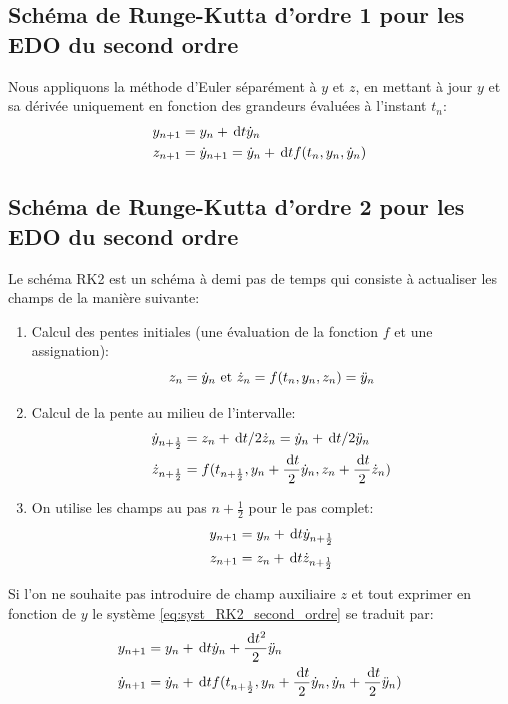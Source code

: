 \documentclass[10pt]{book}
\begin{document}
\begin{appendices}
\subsection{Schéma de Runge-Kutta d'ordre 1 pour les EDO du second ordre}
Nous appliquons la méthode d'Euler séparément à $y$ et $z$, en mettant à jour $y$ et sa dérivée uniquement en fonction des grandeurs évaluées à l'instant $t_{n}$:
$$\begin{aligned}
y_{n+1} &= y_{n}+\,\mathrm{d}t \dot{y}_{n}\\
z_{n+1} &= \dot{y}_{n+1} = \dot{y}_{n}+\,\mathrm{d}t f(t_{n},y_{n},\dot{y}_{n})
\end{aligned}$$
\subsection{Schéma de Runge-Kutta d'ordre 2 pour les EDO du second ordre}
Le schéma RK2 est un schéma à demi pas de temps qui consiste à actualiser les champs de la manière suivante:
\begin{enumerate}
\item Calcul des pentes initiales (une évaluation de la fonction $f$ et une assignation):
$$z_{n}=\dot{y}_{n} \text{ et } \dot{z}_{n} = f(t_{n},y_{n},z_{n})=\ddot{y}_{n}$$
\item Calcul de la pente au milieu de l'intervalle:
$$\begin{aligned}
\dot{y}_{n+\frac{1}{2}} &= z_{n}+\,\mathrm{d}t/2 \dot{z}_{n}=\dot{y}_{n}+\,\mathrm{d}t/2 \ddot{y}_{n}\\
\dot{z}_{n+\frac{1}{2}}&=f(t_{n+\frac{1}{2}},y_{n}+\frac{\,\mathrm{d}t}{2}\dot{y}_{n},z_{n}+\frac{\,\mathrm{d}t}{2}\dot{z}_{n})
\end{aligned}$$
\item On utilise les champs au pas $n+\frac{1}{2}$  pour le pas complet:
\begin{equation}
\begin{aligned}
y_{n+1} &= y_{n}+\,\mathrm{d}t\dot{y}_{n+\frac{1}{2}}\\
z_{n+1} &= z_{n}+\,\mathrm{d}t\dot{z}_{n+\frac{1}{2}}
\end{aligned}
\label{eq:syst_RK2_second_ordre}
\end{equation}
\end{enumerate}
Si l'on ne souhaite pas introduire de champ auxiliaire $z$ et tout exprimer en fonction de $y$ le système \eqref{eq:syst_RK2_second_ordre} se traduit par:
$$\begin{aligned}
y_{n+1} &= y_{n}+\,\mathrm{d}t \dot{y}_{n}+\frac{\,\mathrm{d}t^{2}}{2}\ddot{y}_{n}\\
\dot{y}_{n+1} &= \dot{y}_{n}+\,\mathrm{d}t f(t_{n+\frac{1}{2}},y_{n}+\frac{\,\mathrm{d}t}{2}\dot{y}_{n},\dot{y}_{n}+\frac{\,\mathrm{d}t}{2}\ddot{y}_{n})
\end{aligned}$$

\end{appendices}
\end{document}
